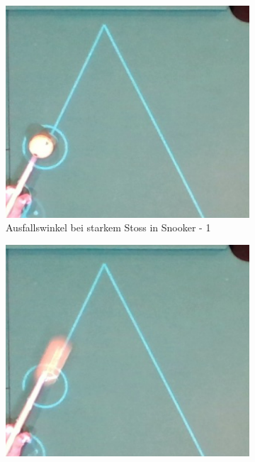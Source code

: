 \begin{figure}[h!]
    \centering
    \begin{subfigure}[t]{0.2\textwidth}
        \centering
        \includegraphics[width=1.0\linewidth]{../common/04_results/resources/simulation/rebound_angle_fast_snooker/00_rail_rebound_angle_fast_snooker_01.png}
        \caption{Ausfallswinkel bei starkem Stoss in Snooker - 1}
        \label{fig:rebound_angle_fast_snooker_1}
    \end{subfigure}
    \hfill
    \begin{subfigure}[t]{0.2\textwidth}
        \centering
        \includegraphics[width=1.0\linewidth]{../common/04_results/resources/simulation/rebound_angle_fast_snooker/00_rail_rebound_angle_fast_snooker_02.png}

\end{subfigure}
\end{figure}
